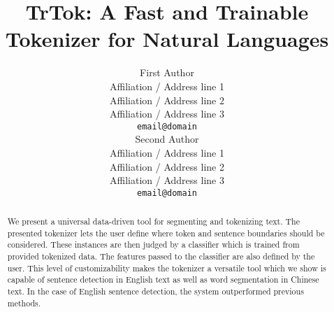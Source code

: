 \documentclass[11pt]{article}
\title{TrTok: A Fast and Trainable Tokenizer for Natural Languages}
\author{First Author \\
  Affiliation / Address line 1 \\
  Affiliation / Address line 2 \\
  Affiliation / Address line 3 \\
  {\tt email@domain} \\\And
  Second Author \\
  Affiliation / Address line 1 \\
  Affiliation / Address line 2 \\
  Affiliation / Address line 3 \\
  {\tt email@domain} \\}
\date{}
\begin{document}
\maketitle
\begin{abstract}
We present a universal data-driven tool for segmenting and tokenizing
text. The presented tokenizer lets the user define where token and
sentence boundaries should be considered. These instances are then
judged by a classifier which is trained from provided tokenized data.
The features passed to the classifier are also defined by the user.
This level of customizability makes the tokenizer a versatile tool
which we show is capable of sentence detection in English text as well
as word segmentation in Chinese text. In the case of English sentence
detection, the system outperformed previous methods.
\end{abstract}









\end{document}
